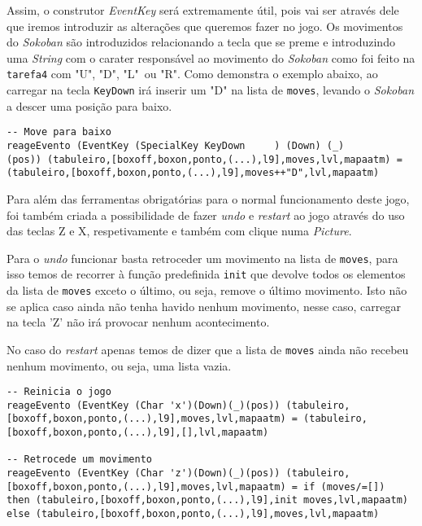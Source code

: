 \documentclass[a4paper,12pt]{report}
\begin{document}
Assim, o construtor {\sl EventKey} será extremamente útil, pois vai ser através dele que iremos introduzir as alterações que queremos fazer no jogo. Os movimentos do {\sl Sokoban} são introduzidos relacionando a tecla que se preme e introduzindo uma {\sl String} com o carater responsável ao movimento do {\sl Sokoban} como foi feito na {\footnotesize\tt tarefa4} com "U", "D", "L" ou "R". Como demonstra o exemplo abaixo, ao carregar na tecla {\footnotesize\tt KeyDown} irá inserir um "D" na lista de {\footnotesize\tt moves}, levando o {\sl Sokoban} a descer uma posição para baixo.
\\
\begin{lstlisting}[caption={\small\sl Excerto da função {\footnotesize\tt reageEvento} que desloca o Sokoban uma posição abaixo.}]
-- Move para baixo
reageEvento (EventKey (SpecialKey KeyDown     ) (Down) (_)         (pos)) (tabuleiro,[boxoff,boxon,ponto,(...),l9],moves,lvl,mapaatm) = (tabuleiro,[boxoff,boxon,ponto,(...),l9],moves++"D",lvl,mapaatm)
\end{lstlisting}

Para além das ferramentas obrigatórias para o normal funcionamento deste jogo, foi também criada a possibilidade de fazer {\sl undo} e {\sl restart} ao jogo através do uso das teclas Z e X, respetivamente e também com clique numa {\sl Picture}.

Para o {\sl undo} funcionar basta retroceder um movimento na lista de {\footnotesize\tt moves}, para isso temos de recorrer à função predefinida {\footnotesize\tt init} que devolve todos os elementos da lista de {\footnotesize\tt moves} exceto o último, ou seja, remove o último movimento. Isto não se aplica caso ainda não tenha havido nenhum movimento, nesse caso, carregar na tecla 'Z' não irá provocar nenhum acontecimento. 

No caso do {\sl restart} apenas temos de dizer que a lista de {\footnotesize\tt moves} ainda não recebeu nenhum movimento, ou seja, uma lista vazia.
\\
\begin{lstlisting}[caption={\small\sl Excerto da função {\footnotesize\tt reageEvento} que é responsável por reiniciar a partida ou retroceder um movimento, usando as teclas X e Z.}]
-- Reinicia o jogo
reageEvento (EventKey (Char 'x')(Down)(_)(pos)) (tabuleiro,[boxoff,boxon,ponto,(...),l9],moves,lvl,mapaatm) = (tabuleiro,[boxoff,boxon,ponto,(...),l9],[],lvl,mapaatm)

-- Retrocede um movimento
reageEvento (EventKey (Char 'z')(Down)(_)(pos)) (tabuleiro,[boxoff,boxon,ponto,(...),l9],moves,lvl,mapaatm) = if (moves/=[]) 
then (tabuleiro,[boxoff,boxon,ponto,(...),l9],init moves,lvl,mapaatm)
else (tabuleiro,[boxoff,boxon,ponto,(...),l9],moves,lvl,mapaatm)   
\end{lstlisting}
\end{document}
